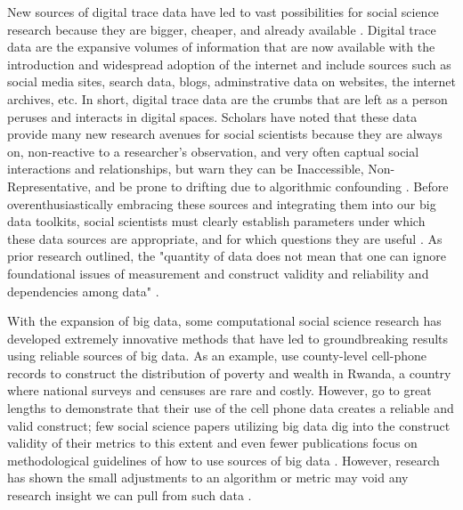 New sources of digital trace data have led to vast possibilities for social science
research because they are bigger, cheaper, and already available 
\citep{kingEnsuringDataRichFuture2011,lazerComputationalSocialScience2009,salganikBitBitSocial2017}.
Digital trace data are the expansive volumes of information that are now available with the
introduction and widespread adoption of the internet and include sources such as  
social media sites, search data, blogs, adminstrative data on websites, the internet 
archives, etc. In short, digital trace data are the crumbs that are left as a person
peruses and interacts in digital spaces. Scholars have noted that these data provide
many new research avenues for social scientists because they are always on, non-reactive to
a researcher's observation, and very often captual social interactions and relationships,
but warn they can be Inaccessible, Non-Representative, and be prone to drifting due to
algorithmic confounding \citep{salganikBitBitSocial2017}.
Before overenthusiastically embracing these
sources and integrating them into our big data toolkits, social scientists must clearly establish
parameters under which these data sources are appropriate, 
and for which questions they are useful 
\citep{bailCulturalEnvironmentMeasuring2014, lazerParableGoogleFlu2014}. As
prior research outlined, the "quantity of data does not mean that one
can ignore foundational issues of measurement and construct validity and
reliability and dependencies among data" 
\citep[p. 1203]{lazerParableGoogleFlu2014}. 

With the expansion of big data, some computational social science research has
developed extremely innovative methods that have led to groundbreaking results using 
reliable sources of big data. As an example,\citet{blumenstockPredictingPovertyWealth2015}
use county-level cell-phone records to construct the distribution of poverty
and wealth in Rwanda, a country where national surveys and censuses are
rare and costly. However, \citet{blumenstockPredictingPovertyWealth2015} go to
great lengths to demonstrate that their use of the cell
phone data creates a reliable and valid construct; few social science
papers utilizing big data dig into the construct validity of their
metrics to this extent and even fewer publications focus on
methodological guidelines of how to use sources of big data
\citep[For exceptions, see ][]{asseoTrackingCOVID19Using2020, stilesAssessingCriterionValidity2018}.
However, research has shown the small adjustments to an algorithm or
metric may void any research insight we can pull from such data
\citep{lazerParableGoogleFlu2014}.

